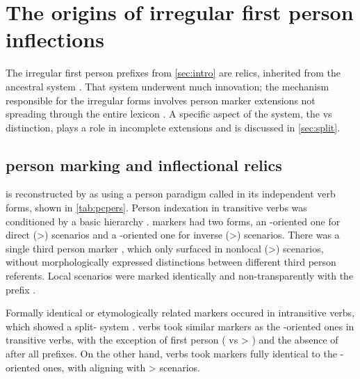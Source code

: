 \section{The origins of irregular first person inflections}
\label{sec:background}
The irregular first person prefixes from \cref{sec:intro} are relics, inherited from the ancestral \PC system .
That system underwent much innovation; the mechanism responsible for the irregular forms involves person marker extensions not spreading through the entire  lexicon .
A specific aspect of the system, the  vs  distinction, plays a role in incomplete extensions and is discussed in \cref{sec:split}.

\subsection{\PC person marking and inflectional relics}
\label{sec:pc_person}
\PC is reconstructed by \textcite{gildea1998} as using a person paradigm called \setone in its independent verb forms, shown in \cref{tab:pcpers}.
Person indexation in transitive verbs was conditioned by a basic hierarchy .
 markers had two forms, an -oriented one for direct (>) scenarios and a -oriented one for inverse (>) scenarios.
There was a single third person marker , which only surfaced in nonlocal (>) scenarios, without morphologically expressed distinctions between different third person referents.
Local scenarios were marked identically and non-transparently with the  prefix .



Formally identical or etymologically related markers occured in intransitive verbs, which showed a split- system .
 verbs took similar markers as the -oriented ones in transitive verbs, with the exception of first person (  vs > ) and the absence of  after all  prefixes.
On the other hand,  verbs took markers fully identical to the -oriented ones, with   aligning with > scenarios.

